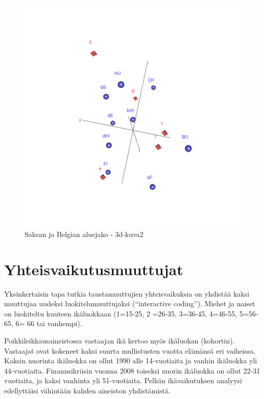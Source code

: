 \documentclass[
  finnish,
]{book}
\begin{document}
\begin{figure}

{\centering \includegraphics[width=0.9\linewidth]{img/3dSymMap_2} 

}

\caption{Saksan ja  Belgian aluejako - 3d-kuva2}\label{fig:3dklippi2}
\end{figure}

\hypertarget{yhteisvaikutusmuuttujat}{%
\chapter{Yhteisvaikutusmuuttujat}\label{yhteisvaikutusmuuttujat}}

Yksinkertaisin tapa tutkia taustamuuttujien yhteisvaikuksia on yhdistää kaksi
muuttujaa uudeksi luokitelumuuttujaksi (``interactive coding''). Miehet ja naiset
on luokiteltu kuuteen ikäluokkaan (1=15-25, 2 =26-35, 3=36-45, 4=46-55, 5=56-65,
6= 66 tai vanhempi).

Poikkileikkausaineistossa vastaajan ikä kertoo myös ikäluokan (kohortin).
Vastaajat ovat kokeneet kaksi suurta mullistusten vuotta elämänsä eri vaiheissa.
Kaksin nuorinta ikäluokka on ollut 1990 alle 14-vuotiaita ja vanhin ikäluokka
yli 44-vuotiaita. Finannsikriisin vuonna 2008 toiseksi nuorin ikäluokka on ollut
22-31 vuotiaita, ja kaksi vanhinta yli 51-vuotiaita. Pelkän ikävaikutuksen
analyysi edellyttäisi vähintään kahden aineiston yhdistämistä.
\end{document}
